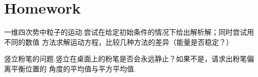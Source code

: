     \section{Homework}
    \begin{asg}
        一维四次势中粒子的运动.尝试在给定初始条件的情况下给出解析解；同时尝试用不同的数值
        方法求解运动方程，比较几种方法的差异（能量是否稳定？）
    \end{asg}
    \begin{asg}
        竖立粉笔的问题.竖立在桌面上的粉笔是否会永远静止？如果不是，请求出粉笔偏离平衡位置的
        角度的平均值与平方平均值.
    \end{asg}
    
    
